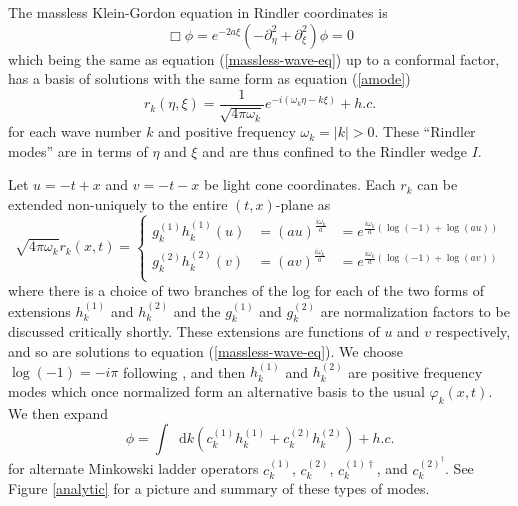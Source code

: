 \documentclass[12pt,a4paper]{article}
\newcommand*\diff{\mathop{}\!\mathrm{d}}
\begin{document}
The massless Klein-Gordon equation in Rindler coordinates is
\begin{equation}
  \Box \phi = e^{-2a \xi}(-\partial_\eta^2 + \partial_\xi^2) \phi = 0
\end{equation}
which being the same as equation (\ref{massless-wave-eq}) up to a conformal factor, has a basis of solutions with the same form as equation (\ref{amode})
\begin{equation}
 r_k(\eta,\xi) = \frac{1}{\sqrt{4 \pi \omega_k}} e^{-i(\omega_k \eta -k \xi)} + h.c.
\end{equation}
for each wave number $k$ and positive frequency $\omega_k = |k| > 0$.  These ``Rindler modes'' are in terms of $\eta$ and $\xi$ and are thus confined to the Rindler wedge $I$.


Let $u = -t + x$ and $v = -t - x$ be light cone coordinates.  Each $r_k$ can be extended non-uniquely to the entire $(t,x)$-plane as
\begin{equation}
  \sqrt{4 \pi \omega_k} r_k(x,t) = \left\{\begin{array}{lll}
      g_k^{(1)} h_k^{(1)}(u)&={(au)}^{\frac{i\omega_k}{a}} &=  e^{\frac{i\omega_k}{a} \left(\log(-1) + \log(au)\right)}\\
      g_k^{(2)} h_k^{(2)}(v)&={(av)}^{\frac{i\omega_k}{a}} &= e^{\frac{i\omega_k}{a} \left(\log(-1) + \log(av)\right)}\\  
    \end{array}\right.
\end{equation}
where there is a choice of two branches of the log for each of the two forms of extensions $h_k^{(1)}$ and $h_k^{(2)}$ and the $g_k^{(1)}$ and $g_k^{(2)}$ are normalization factors to be discussed critically shortly. These extensions are functions of $u$ and $v$ respectively, and so are solutions to equation (\ref{massless-wave-eq}). We choose $\log(-1) = -i \pi$ following \cite{Frodden}, and then $h_k^{(1)}$ and $h_k^{(2)}$ are positive frequency modes which once normalized form an alternative basis to the usual $\varphi_k(x,t)$. We then expand
\begin{equation}
  \phi = \int \diff k( c_k^{(1)} h_k^{(1)} + c_k^{(2)} h_k^{(2)}) + h.c.  
\end{equation}
for alternate Minkowski ladder operators $c_k^{(1)}$, $c_k^{(2)}$, $c_k^{(1)\dagger}$, and $c_k^{(2)^\dagger}$. See Figure \ref{analytic} for a picture and summary of these types of modes.
\end{document}
